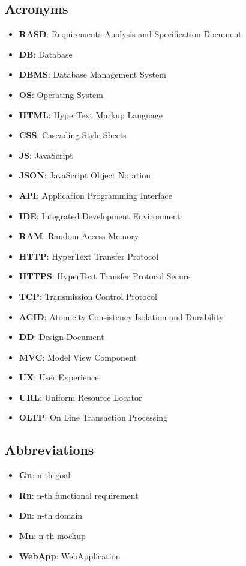 \documentclass[numbers=noenddot, 12pt, a4paper, oneside]{scrbook}
\begin{document}
\subsection*{Acronyms}

\begin{itemize}
	\item \textbf{RASD}: Requirements Analysis and Specification Document
	\item \textbf{DB}: Database
	\item \textbf{DBMS}: Database Management System
	\item \textbf{OS}: Operating System 
	\item \textbf{HTML}: HyperText Markup Language
	\item \textbf{CSS}: Cascading Style Sheets
	\item \textbf{JS}: JavaScript
	\item \textbf{JSON}: JavaScript Object Notation
	\item \textbf{API}: Application Programming Interface
	\item \textbf{IDE}: Integrated Development Environment
	\item \textbf{RAM}: Random Access Memory
	\item \textbf{HTTP}: HyperText Transfer Protocol
	\item \textbf{HTTPS}: HyperText Transfer Protocol Secure
	\item \textbf{TCP}: Transmission Control Protocol
	\item \textbf{ACID}: Atomicity Consistency Isolation and Durability
	\item \textbf{DD}: Design Document
	\item \textbf{MVC}: Model View Component
	\item \textbf{UX}: User Experience
	\item \textbf{URL}: Uniform Resource Locator
	\item \textbf{OLTP}: On Line Transaction Processing
	
\end{itemize}

\subsection*{Abbreviations}
\begin{itemize}
	\item \textbf{Gn}: n-th goal
	\item \textbf{Rn}: n-th functional requirement
	\item \textbf{Dn}: n-th domain
	\item \textbf{Mn}: n-th mockup
	\item \textbf{WebApp}: WebApplication 
\end{itemize}
\end{document}
